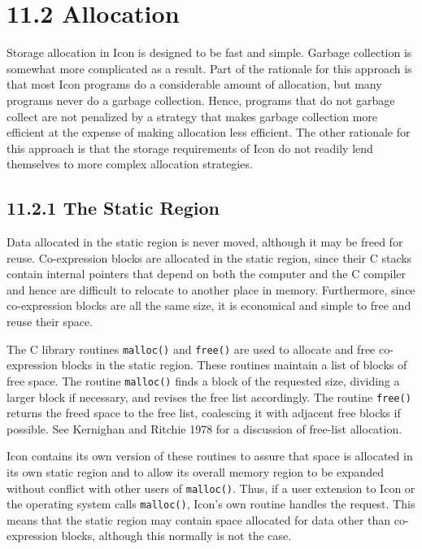 \section[11.2 Allocation]{11.2 Allocation}

Storage allocation in Icon is designed to be fast and simple. Garbage
collection is somewhat more complicated as a result. Part of the
rationale for this approach is that most Icon programs do a
considerable amount of allocation, but many programs never do a
garbage collection. Hence, programs that do not garbage collect are
not penalized by a strategy that makes garbage collection more
efficient at the expense of making allocation less efficient. The
other rationale for this approach is that the storage requirements of
Icon do not readily lend themselves to more complex allocation
strategies.

\subsection[11.2.1 The Static Region]{11.2.1 The Static Region}

Data allocated in the static region is never moved, although it may be
freed for reuse. Co-expression blocks are allocated in the static
region, since their C stacks contain internal pointers that depend on
both the computer and the C compiler and hence are difficult to
relocate to another place in memory. Furthermore, since co-expression
blocks are all the same size, it is economical and simple to free and
reuse their space.

The C library routines \texttt{malloc()} and \texttt{free()} are used
to allocate and free co-expression blocks in the static region. These
routines maintain a list of blocks of free space. The routine
\texttt{malloc()} finds a block of the requested size, dividing a
larger block if necessary, and revises the free list accordingly. The
routine \texttt{free()} returns the freed space to the free list,
coalescing it with adjacent free blocks if possible. See Kernighan and
Ritchie 1978 for a discussion of free-list allocation.

Icon contains its own version of these routines to assure that space
is allocated in its own static region and to allow its overall memory
region to be expanded without conflict with other users of
\texttt{malloc()}. Thus, if a user extension to Icon or the operating
system calls \texttt{malloc()}, Icon's own routine handles the
request. This means that the static region may contain space allocated
for data other than co-expression blocks, although this normally is
not the case.

